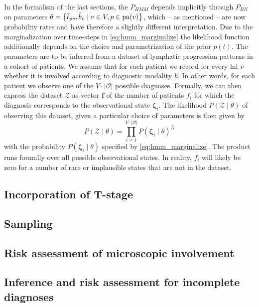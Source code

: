\documentclass[../ms.tex]{subfiles}
\begin{document}
In the formalism of the last sections, the $P_{HMM}$ depends implicitly through $P_{BN}$ on parameters $\theta = \left\{ \Tilde{t}_{pv} , \Tilde{b}_v \mid v \in V , p \in \operatorname{pa}(v) \right\}$, which – as mentioned – are now probability rates and have therefore a slightly different interpretation. Due to the marginalization over time-steps in \cref{eq:hmm_marginalize} the likelihood function additionally depends on the choice and parametrization of the prior $p(t)$. The parameters are to be inferred from a dataset of lymphatic progression patterns in a cohort of patients. We assume that for each patient we record for every \gls{lnl} $v$ whether it is involved according to diagnostic modality $k$. In other words, for each patient we observe one of the $V \cdot |\mathcal{O}|$ possible diagnoses. Formally, we can then express the dataset $\boldsymbol{\mathcal{Z}}$ as vector $\mathbf{f}$ of the number of patients $f_i$ for which the diagnosis corresponds to the observational state $\boldsymbol{\zeta}_i$. The likelihood $P \left( \boldsymbol{\mathcal{Z}} \mid \theta \right)$ of observing this dataset, given a particular choice of parameters is then given by
%
\begin{equation}
    P \left( \boldsymbol{\mathcal{Z}} \mid \theta \right) = \prod_{i=1}^{V \cdot |\mathcal{O}|}{P \left( \boldsymbol{\zeta}_i \mid \theta \right)^{f_i}}
\end{equation}
%
with the probability $P \left( \boldsymbol{\zeta}_i \mid \theta \right)$ specified by \cref{eq:hmm_marginalize}. The product runs formally over all possible observational states. In reality, $f_i$ will likely be zero for a number of rare or implausible states that are not in the dataset.
\subsection{Incorporation of T-stage}
\label{subsec:hmm_tstage}

\subsection{Sampling}
\label{subsec:hmm_sampling}

\subsection{Risk assessment of microscopic involvement}
\label{subsec:hmm_risk_assessment}

\subsection{Inference and risk assessment for incomplete diagnoses}
\label{subsec:hmm_incomplete_diag}
\end{document}
